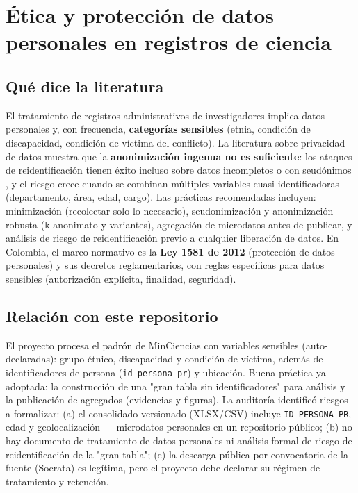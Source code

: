 \section{Ética y protección de datos personales en registros de ciencia}

\subsection{Qué dice la literatura}

El tratamiento de registros administrativos de investigadores implica datos
personales y, con frecuencia, \textbf{categorías sensibles} (etnia, condición
de discapacidad, condición de víctima del conflicto). La literatura sobre
privacidad de datos muestra que la \textbf{anonimización ingenua no es
suficiente}: los ataques de reidentificación tienen éxito incluso sobre datos
incompletos o con seudónimos \citep{rocher2019estimating}, y el riesgo crece
cuando se combinan múltiples variables cuasi-identificadoras (departamento,
área, edad, cargo). Las prácticas recomendadas incluyen: minimización
(recolectar solo lo necesario), seudonimización y anonimización robusta
(k-anonimato y variantes), agregación de microdatos antes de publicar, y
análisis de riesgo de reidentificación previo a cualquier liberación de datos.
En Colombia, el marco normativo es la \textbf{Ley 1581 de 2012} (protección de
datos personales) y sus decretos reglamentarios, con reglas específicas para
datos sensibles (autorización explícita, finalidad, seguridad).

\subsection{Relación con este repositorio}

El proyecto procesa el padrón de MinCiencias con variables sensibles
(auto-declaradas): grupo étnico, discapacidad y condición de víctima, además de
identificadores de persona (\texttt{id\_persona\_pr}) y ubicación. Buena
práctica ya adoptada: la construcción de una "gran tabla sin identificadores"
para análisis y la publicación de agregados (evidencias y figuras). La
auditoría identificó riesgos a formalizar: (a) el consolidado versionado
(XLSX/CSV) incluye \texttt{ID\_PERSONA\_PR}, edad y geolocalización — microdatos
personales en un repositorio público; (b) no hay documento de tratamiento de
datos personales ni análisis formal de riesgo de reidentificación de la "gran
tabla"; (c) la descarga pública por convocatoria de la fuente (Socrata) es
legítima, pero el proyecto debe declarar su régimen de tratamiento y retención.

